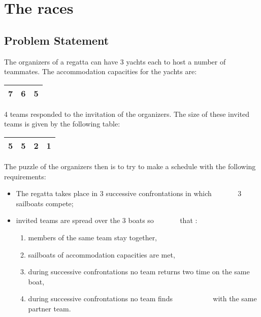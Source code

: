 
\chapter{The races}


\section{Problem Statement}
\label{sec:enonce-probleme}


The organizers of a regatta can have 3 yachts each to host a number of teammates. The  accommodation capacities for the yachts are:
\begin{center}
    \begin{tabular}{|c|c|c|}
        \hline
	7&6&5\\
        \hline
    \end{tabular}
\end{center}



4 teams responded to the invitation of the organizers. The size of these
invited teams is given by the following table:

\begin{center}
    \begin{tabular}{|c|c|c|c|}
        \hline
	5&5&2&1\\
        \hline
    \end{tabular}
\end{center}


The puzzle of the organizers then is to try to make a schedule
with the following requirements:

\begin{itemize}

\item The regatta takes place in 3 successive confrontations in which
       3 sailboats compete;

\item invited teams are spread over the 3 boats so
       that :

    \begin{enumerate}

    \item members of the same team stay together,
    \item sailboats of accommodation capacities are met,
    \item during successive confrontations no team returns two time on the same boat,
    \item during successive confrontations no team finds
           with the same partner team.
    \end{enumerate}

\end{itemize}

